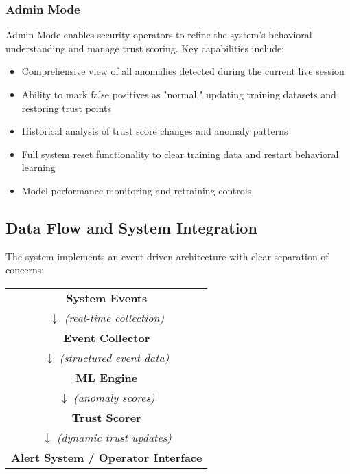 \documentclass[conference]{IEEEtran}
\begin{document}
\subsubsection{Admin Mode}
Admin Mode enables security operators to refine the system's behavioral understanding and manage trust scoring. Key capabilities include:
\begin{itemize}[leftmargin=*]
  \item Comprehensive view of all anomalies detected during the current live session
  \item Ability to mark false positives as "normal," updating training datasets and restoring trust points
  \item Historical analysis of trust score changes and anomaly patterns
  \item Full system reset functionality to clear training data and restart behavioral learning
  \item Model performance monitoring and retraining controls
\end{itemize}

\subsection{Data Flow and System Integration}
The system implements an event-driven architecture with clear separation of concerns:

\begin{center}
\setlength{\arraycolsep}{1.5em}
\renewcommand{\arraystretch}{1.5}
\begin{tabular}{c}
\textbf{System Events} \\[-0.5ex]
$\downarrow$ \textit{(real-time collection)} \\[-0.5ex]
\textbf{Event Collector} \\[-0.5ex]
$\downarrow$ \textit{(structured event data)} \\[-0.5ex]
\textbf{ML Engine} \\[-0.5ex]
$\downarrow$ \textit{(anomaly scores)} \\[-0.5ex]
\textbf{Trust Scorer} \\[-0.5ex]
$\downarrow$ \textit{(dynamic trust updates)} \\[-0.5ex]
\textbf{Alert System / Operator Interface}
\end{tabular}
\end{center}
\end{document}
